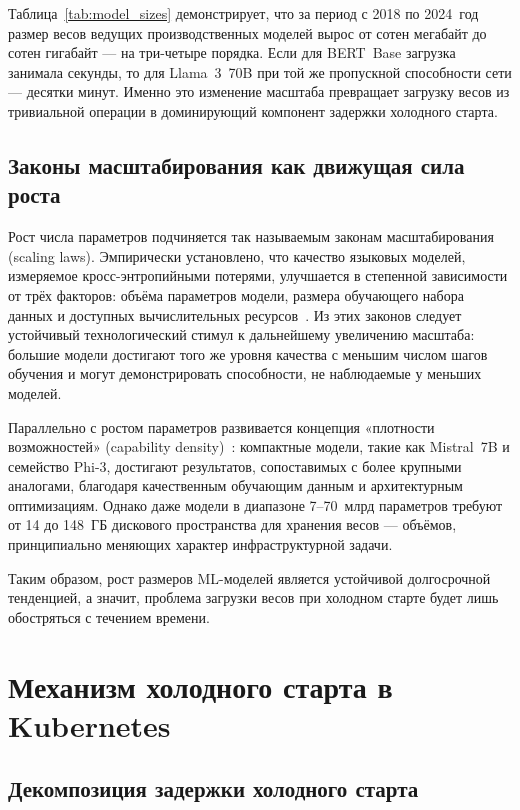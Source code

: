 Таблица~\ref{tab:model_sizes} демонстрирует, что за период с 2018 по 2024~год размер весов ведущих производственных моделей вырос от сотен мегабайт до сотен гигабайт — на три-четыре порядка. Если для BERT~Base загрузка занимала секунды, то для Llama~3~70B при той же пропускной способности сети — десятки минут. Именно это изменение масштаба превращает загрузку весов из тривиальной операции в доминирующий компонент задержки холодного старта.

\subsection{Законы масштабирования как движущая сила роста}

Рост числа параметров подчиняется так называемым законам масштабирования (scaling laws). Эмпирически установлено, что качество языковых моделей, измеряемое кросс-энтропийными потерями, улучшается в степенной зависимости от трёх факторов: объёма параметров модели, размера обучающего набора данных и доступных вычислительных ресурсов~\cite{gpt3_2020}. Из этих законов следует устойчивый технологический стимул к дальнейшему увеличению масштаба: большие модели достигают того же уровня качества с меньшим числом шагов обучения и могут демонстрировать способности, не наблюдаемые у меньших моделей.

Параллельно с ростом параметров развивается концепция «плотности возможностей» (capability density)~\cite{capability_density}: компактные модели, такие как Mistral~7B и семейство Phi-3, достигают результатов, сопоставимых с более крупными аналогами, благодаря качественным обучающим данным и архитектурным оптимизациям. Однако даже модели в диапазоне 7--70~млрд параметров требуют от 14 до 148~ГБ дискового пространства для хранения весов — объёмов, принципиально меняющих характер инфраструктурной задачи.

Таким образом, рост размеров ML-моделей является устойчивой долгосрочной тенденцией, а значит, проблема загрузки весов при холодном старте будет лишь обостряться с течением времени.

\section{Механизм холодного старта в Kubernetes}

\subsection{Декомпозиция задержки холодного старта}


